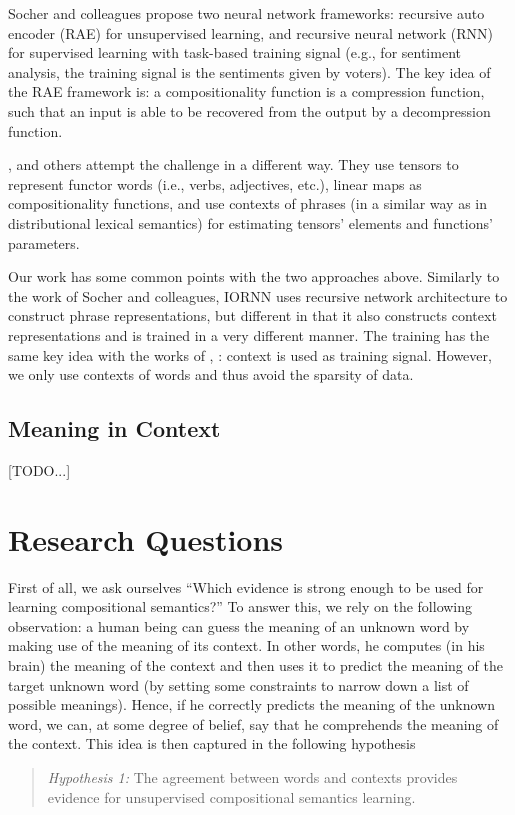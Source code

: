 \documentclass[11pt]{article}
\begin{document}
Socher and colleagues propose two neural network frameworks: recursive auto encoder (RAE) 
\cite{socher_semi-supervised_2011} for 
unsupervised learning, and recursive neural network (RNN) for supervised learning with task-based 
training signal \cite{socher_learning_2010}
(e.g., for sentiment analysis, the training signal is the sentiments given by voters). 
The key idea of the RAE framework is: a compositionality function is a compression function, 
such that an input is able to be recovered from the output by a decompression function. 

,  and others attempt the challenge 
in a different way. 
They use tensors to represent functor words (i.e., verbs, adjectives, etc.), 
linear maps as compositionality functions, and use contexts of phrases (in a similar way as in
distributional lexical semantics) for estimating tensors' elements and 
functions' parameters. 

Our work has some common points with the two approaches above. Similarly to the work of 
Socher and colleagues, IORNN uses recursive network architecture to construct 
phrase representations, but different in that it also constructs context representations and 
is trained in a very different manner. The training has the same key idea with the works of 
, : context is used 
as training signal. However, we only use contexts of words and thus avoid 
the sparsity of data.


\subsection{Meaning in Context}
\label{subsection meaning in context}
[TODO...]


\section{Research Questions}
\label{section question}

First of all, we ask ourselves ``Which evidence is strong enough to be used for 
learning compositional semantics?'' %
To answer this, we rely on the 
following observation: a human being can guess the meaning of an unknown 
word by making use of the meaning of its context. In other words, he computes 
(in his brain) the meaning of the context and then uses it to predict the meaning 
of the target unknown word (by setting some constraints to narrow down a list of 
possible meanings). Hence, if he correctly predicts the meaning of the unknown word, 
we can, at some degree of belief, say that he comprehends the meaning of the context. 
This idea is then captured in the following hypothesis
\begin{quote}
\textit{Hypothesis 1:} The agreement between words and contexts provides evidence for unsupervised 
compositional semantics learning. 
\end{quote}
\end{document}
